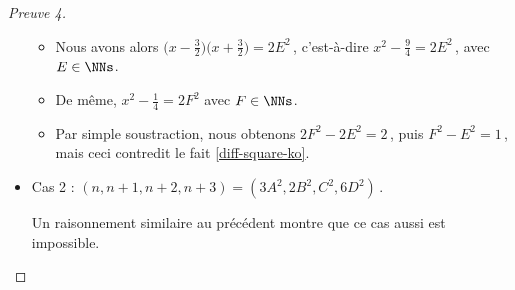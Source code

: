 \begin{proof}[Preuve 4]
\begin{itemize}
\begin{itemize}
        	\item Nous avons alors
        	$\big( x - \frac32 \big) \big( x + \frac32 \big) = 2 E^2$\,, c'est-à-dire $x^2 - \frac94 = 2 E^2$\,, avec $E \in \NNs$.
        
        	\item De même,
        	$x^2 - \frac14 = 2 F^2$ avec $F \in \NNs$.	
        
        	\item Par simple soustraction, nous obtenons $2 F^2 - 2 E^2 = 2$\,, puis $F^2 - E^2 = 1$\,, mais ceci contredit le fait \ref{diff-square-ko}.
        \end{itemize}
    	
	
		\item Cas 2 : $(n, n+1, n+2, n+3) = (3A^2, 2B^2, C^2, 6D^2)$\,.
		
		\smallskip
		\noindent
		Un raisonnement similaire au précédent montre que ce cas aussi est impossible. \qedhere
    \end{itemize}
\end{proof}

